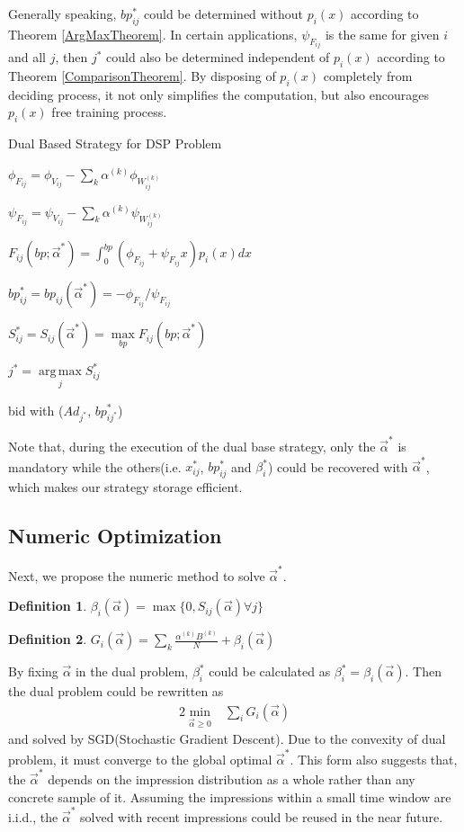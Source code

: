 \documentclass{article}
\DeclareMathOperator*{\argmax}{arg\,max}
\newtheorem{definition}{Definition}[section]
\newcommand{\sx}{x_{ij}}
\newcommand{\sbp}{bp_{ij}}
\newcommand{\sV}{V_{ij}}
\newcommand{\sW}{W_{ij}^{(k)}}
\newcommand{\sB}{B^{(k)}}
\newcommand{\salpha}{\alpha^{(k)}}
\newcommand{\sbeta}{\beta_i}
\newcommand{\sF}{F_{ij}}
\newcommand{\sS}{S_{ij}}
\newcommand{\sG}{G_i}
\newcommand{\valpha}{\vec{\alpha}}
\newcommand{\pprob}{\phi}
\newcommand{\pcost}{\psi}
\begin{document}
Generally speaking, $\sbp^*$ could be determined without $p_i(x)$ according to Theorem \ref{ArgMaxTheorem}.
In certain applications, $\pcost_{\sF}$ is the same for given $i$ and all $j$,
    then $j^*$ could also be determined independent of $p_i(x)$ according to Theorem \ref{ComparisonTheorem}.
By disposing of $p_i(x)$ completely from deciding process, it not only simplifies the computation,
    but also encourages $p_i(x)$ free training process.

\begin{algorithm}
\caption{Dual Based Strategy for DSP Problem \label{DSPAlgo}}

{
  {
    $\pprob_{\sF} = \pprob_{\sV} - \sum\limits_k \salpha \pprob_{\sW}$

    $\pcost_{\sF} = \pcost_{\sV} - \sum\limits_k \salpha \pcost_{\sW}$

    $\sF(bp; \valpha^*) = \int_0^{bp} (\pprob_{\sF}+\pcost_{\sF}x)p_i(x)dx$

    $\sbp^* = \sbp(\valpha^*) = -\pprob_{\sF} / \pcost_{\sF}$

    $\sS^* = \sS(\valpha^*) = \max\limits_{bp} \sF(bp; \valpha^*)$
  }
  $j^* = \argmax\limits_j \sS^*$
  
   { bid with ($Ad_{j^*}$, $bp_{ij^*}^*$) }
}
\end{algorithm}

Note that, during the execution of the dual base strategy,
    only the $\valpha^*$ is mandatory while the others(i.e. $\sx^*$, $\sbp^*$ and $\sbeta^*$) could be recovered with $\valpha^*$,
    which makes our strategy storage efficient.

\subsection{Numeric Optimization} \label{DSPNumericOptimization}

Next, we propose the numeric method to solve $\valpha^*$.

\begin{definition}
$\sbeta(\valpha) = \max \{ 0, \sS(\valpha) \forall j \}$
\end{definition}

\begin{definition}
$\sG(\valpha) = \sum\limits_k \frac{\salpha \sB}{N} + \sbeta(\valpha)$
\end{definition}

By fixing $\valpha$ in the dual problem, $\sbeta^*$ could be calculated as $\sbeta^* = \sbeta(\valpha)$.
Then the dual problem could be rewritten as
\begin{alignat}{2}
\min\limits_{\valpha \ge 0} & \sum\limits_i \sG(\valpha)
\end{alignat}
    and solved by SGD(Stochastic Gradient Descent).
Due to the convexity of dual problem, it must converge to the global optimal $\valpha^*$.
This form also suggests that, the $\valpha^*$ depends on the impression distribution as a whole
    rather than any concrete sample of it.
Assuming the impressions within a small time window are i.i.d.,
    the $\valpha^*$ solved with recent impressions could be reused in the near future.
\end{document}

